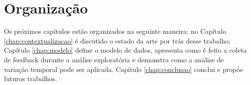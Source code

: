 \section{Organização}

Os próximos capítulos estão organizados na seguinte maneira: no Capítulo \ref{chap:contextualizacao} é discutido o estado da arte por trás desse trabalho; Capítulo \ref{chap:modelo} define o modelo de dados, apresenta como é feito a coleta de feedback durante a análise exploratória e demonstra como a análise de variação temporal pode ser aplicada. Capítulo \ref{chap:conclusao} conclui e propõe futuros trabalhos.

